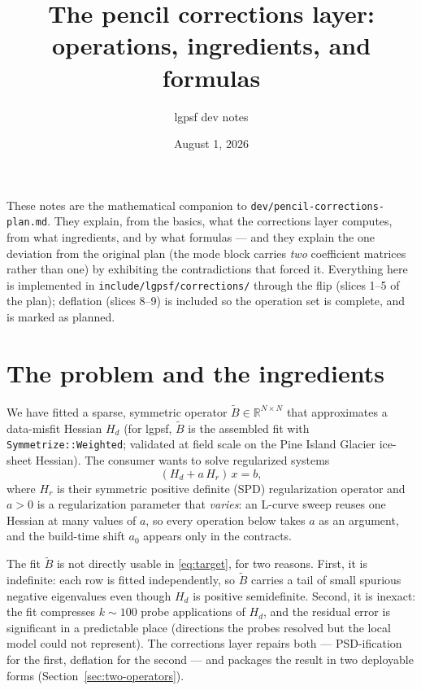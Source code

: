 \documentclass[11pt]{article}
\title{The pencil corrections layer:\\ operations, ingredients, and formulas}
\author{lgpsf dev notes}
\date{August 1, 2026}
\newcommand{\Bt}{\widetilde{B}}
\newcommand{\Hd}{H_d}
\newcommand{\Hr}{H_r}
\newcommand{\R}{\mathbb{R}}
\begin{document}
\maketitle

\noindent
These notes are the mathematical companion to
\texttt{dev/pencil-corrections-plan.md}. They explain, from the basics, what
the corrections layer computes, from what ingredients, and by what formulas
--- and they explain the one deviation from the original plan (the mode
block carries \emph{two} coefficient matrices rather than one) by exhibiting
the contradictions that forced it. Everything here is implemented in
\texttt{include/lgpsf/corrections/} through the flip
(slices 1--5 of the plan); deflation (slices 8--9) is included so the
operation set is complete, and is marked as planned.

\section{The problem and the ingredients}

We have fitted a sparse, symmetric operator $\Bt \in \R^{N \times N}$ that
approximates a data-misfit Hessian $\Hd$ (for lgpsf, $\Bt$ is the assembled
fit with \texttt{Symmetrize::Weighted}; validated at field scale on the Pine
Island Glacier ice-sheet Hessian). The consumer wants to solve
regularized systems
\begin{equation}
  (\Hd + a\,\Hr)\, x = b,
  \label{eq:target}
\end{equation}
where $\Hr$ is their symmetric positive definite (SPD) regularization
operator and $a > 0$ is a regularization parameter that \emph{varies}: an
L-curve sweep reuses one Hessian at many values of $a$, so every operation
below takes $a$ as an argument, and the build-time shift $a_0$ appears only
in the contracts.

The fit $\Bt$ is not directly usable in \eqref{eq:target}, for two reasons.
First, it is indefinite: each row is fitted independently, so $\Bt$ carries
a tail of small spurious negative eigenvalues even though $\Hd$ is positive
semidefinite. Second, it is inexact: the fit compresses $k \sim 100$ probe
applications of $\Hd$, and the residual error is significant in a
predictable place (directions the probes resolved but the local model could
not represent). The corrections layer repairs both --- PSD-ification for the
first, deflation for the second --- and packages the result in two
deployable forms (Section~\ref{sec:two-operators}).
\end{document}
